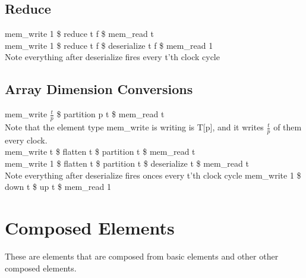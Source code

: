 \documentclass[11pt,fleqn]{article}
\numberwithin{equation}{subsection}
\begin{document}
\subsection{Reduce}
\begin{adjustwidth}{2.5 em}{0 pt}
    mem\_write 1 \$ reduce t f \$ mem\_read t \\
    mem\_write 1 \$ reduce t f \$ deserialize t f \$ mem\_read 1 \\
        \null \qquad Note everything after deserialize fires every t'th clock cycle
\end{adjustwidth}

\subsection{Array Dimension Conversions}
\begin{adjustwidth}{2.5 em}{0 pt}
    mem\_write $\frac{t}{p}$ \$ partition p t \$ mem\_read t \\
        \null \qquad Note that the element type mem\_write is writing is T[p], 
        and it writes $\frac{t}{p}$ of them every clock. \\
    mem\_write t \$ flatten t \$ partition t \$ mem\_read t \\
    mem\_write 1 \$ flatten t \$ partition t \$ deserialize t \$ mem\_read t \\
        \null \qquad Note everything after deserialize fires onces every t'th 
        clock cycle
    mem\_write 1 \$ down t \$ up t \$ mem\_read 1
\end{adjustwidth}

\section{Composed Elements}
These are elements that are composed from basic elements and other other composed
elements.
\end{document}
